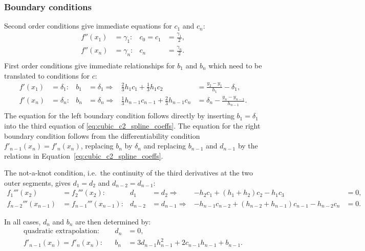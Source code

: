 \documentclass[11pt]{article}
\newcommand{\follows}{\Rightarrow}
\theoremstyle{break}            %
\begin{document}
\subsubsection*{Boundary conditions}
Second order conditions give immediate equations for $c_1$ and $c_n$:
\begin{equation*}
\begin{aligned}
    f''(x_1)&=\gamma_1: & c_0=c_1 & = \frac{\gamma_1}{2},\\
    f''(x_n)&=\gamma_n: & c_n & = \frac{\gamma_n}{2}.\\
\end{aligned}
\end{equation*}
First order conditions give immediate relationships for $b_1$ and $b_n$
which need to be translated to conditions for $c$:
\begin{equation*}
\begin{aligned}
    f'(x_1)&=\delta_1: & b_1&=\delta_1 \follows&
        \frac{2}{3}h_1 c_1 +\frac{1}{3}h_1 c_2
        & = \frac{y_2-y_1}{h_1} -\delta_1,\\
    f'(x_n)&=\delta_n: & b_n&=\delta_n \follows&
        \frac{1}{3}h_{n-1} c_{n-1} +\frac{2}{3}h_{n-1} c_n
        & = \delta_n - \frac{y_n-y_{n-1}}{h_{n-1}}.\\
\end{aligned}
\end{equation*}
The equation for the left boundary condition follows directly by inserting
$b_1=\delta_1$ into the third equation of \eqref{eq:cubic_c2_spline_coeffs}.
The equation for the right boundary condition follows from the
differentiability condition $f'_{n-1}(x_n)  = f'_n(x_n)$, replacing
$b_n$ by $\delta_n$ and replacing $b_{n-1}$ and $d_{n-1}$ by the relations
in Equation~\eqref{eq:cubic_c2_spline_coeffs}.

The not-a-knot condition, i.e.\ the continuity of the third derivatives
at the two outer segments, gives $d_1=d_2$ and $d_{n-2}=d_{n-1}$:
\begin{equation*}
\begin{aligned}
    f_1'''(x_2)&=f_2'''(x_2): & d_1&=d_2 \follows&
    -h_2 c_1 + (h_1+h_2) c_2 - h_1 c_3 & = 0,\\
    f_{n-2}'''(x_{n-1})&=f_{n-1}'''(x_{n-1}): & d_{n-2}&=d_{n-1}\follows&
    -h_{n-1} c_{n-2} + (h_{n-2}+h_{n-1}) c_{n-1} - h_{n-2} c_n & = 0.
\end{aligned}
\end{equation*}



In all cases, $d_n$ and $b_n$ are then determined by:
\begin{equation*}
\begin{aligned}
    \text{quadratic extrapolation:} & & d_n & = 0,\\
    f'_{n-1}(x_n)  = f'_n(x_n): & & b_n & = 3 d_{n-1} h_{n-1}^2 + 2 c_{n-1} h_{n-1} + b_{n-1}.
\end{aligned}
\end{equation*}
\end{document}
